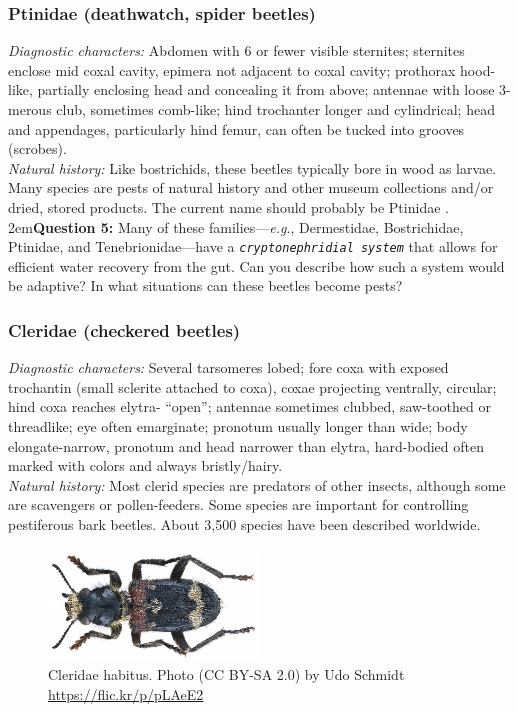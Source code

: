 \documentclass[letterpaper, 11pt]{article}
\newcommand{\latinword}[1]{\texttt{\itshape #1}}%
\begin{document}
\subsubsection{Ptinidae (deathwatch, spider beetles)}
\noindent{}\textit{Diagnostic characters:} Abdomen with 6 or fewer visible sternites; sternites enclose mid coxal cavity, epimera not adjacent to coxal cavity; prothorax hood-like, partially enclosing head and concealing it from above; antennae with loose 3-merous club, sometimes comb-like; hind trochanter longer and cylindrical; head and appendages, particularly hind femur, can often be tucked into grooves (scrobes).\\

\noindent{}\textit{Natural history:} Like bostrichids, these beetles typically bore in wood as larvae. Many species are pests of natural history and other museum collections and/or dried, stored products. The current name should probably be Ptinidae \citep{arango2012death}.\\

\hangindent2em\textbf{Question 5:} Many of these families---\textit{e.g}., Dermestidae, Bostrichidae, Ptinidae, and Tenebrionidae---have a \latinword{cryptonephridial system} that allows for efficient water recovery from the gut. Can you describe how such a system would be adaptive? In what situations can these beetles become pests?\\

\subsubsection{Cleridae (checkered beetles)}
\noindent{}\textit{Diagnostic characters:} Several tarsomeres lobed; fore coxa with exposed trochantin (small sclerite attached to coxa), coxae projecting ventrally, circular; hind coxa reaches elytra- ``open''; antennae sometimes clubbed, saw-toothed or threadlike; eye often emarginate; pronotum usually longer than wide; body elongate-narrow, pronotum and head narrower than elytra, hard-bodied often marked with colors and always bristly/hairy.\\

\noindent{}\textit{Natural history:} Most clerid species are predators of other insects, although some are scavengers or pollen-feeders. Some species are important for controlling pestiferous bark beetles. About 3,500 species have been described worldwide.

\begin{figure}[ht!]
  \centering
    \includegraphics[width=0.5\textwidth]{CleridHabitus}
  \caption{Cleridae habitus. Photo (CC BY-SA 2.0) by Udo Schmidt \url{https://flic.kr/p/pLAeE2}}
  \label{fig:clerid}
\end{figure}
\end{document}
